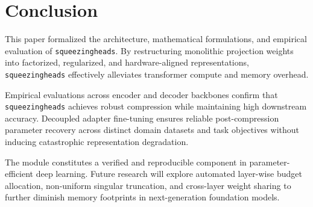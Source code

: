 \section{Conclusion}
This paper formalized the architecture, mathematical formulations, and empirical evaluation of \texttt{squeezingheads}. By restructuring monolithic projection weights into factorized, regularized, and hardware-aligned representations, \texttt{squeezingheads} effectively alleviates transformer compute and memory overhead.

Empirical evaluations across encoder and decoder backbones confirm that \texttt{squeezingheads} achieves robust compression while maintaining high downstream accuracy. Decoupled adapter fine-tuning ensures reliable post-compression parameter recovery across distinct domain datasets and task objectives without inducing catastrophic representation degradation.

The module constitutes a verified and reproducible component in parameter-efficient deep learning. Future research will explore automated layer-wise budget allocation, non-uniform singular truncation, and cross-layer weight sharing to further diminish memory footprints in next-generation foundation models.
